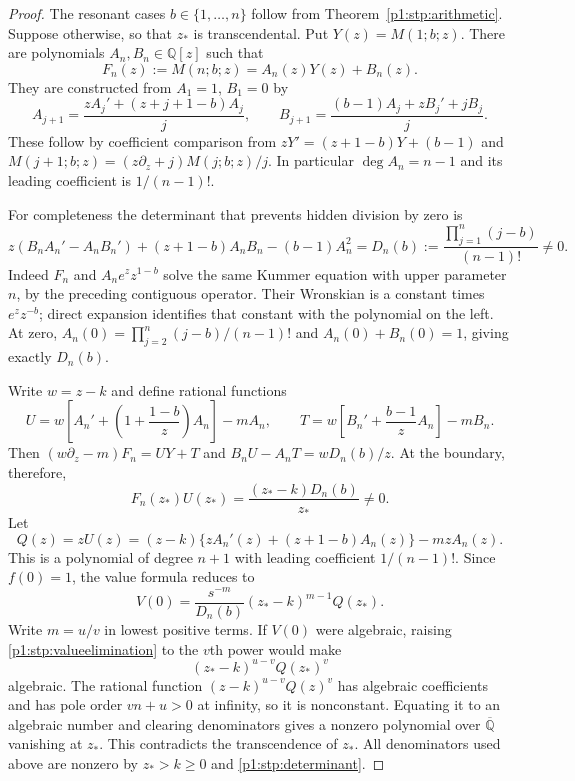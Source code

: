 \documentclass[11pt,a4paper]{article}
\theoremstyle{definition}
\theoremstyle{remark}
\numberwithin{equation}{section}
\begin{document}
\begin{proof}
The resonant cases $b\in\{1,\ldots,n\}$ follow from
Theorem~\ref{p1:stp:arithmetic}.  Suppose otherwise, so that $z_*$
is transcendental.  Put $Y(z)=M(1;b;z)$.  There are polynomials
$A_n,B_n\in\mathbb Q[z]$ such that
\[
 F_n(z):=M(n;b;z)=A_n(z)Y(z)+B_n(z).
\]
They are constructed from $A_1=1$, $B_1=0$ by
\[
 A_{j+1}=\frac{zA_j'+(z+j+1-b)A_j}{j},\qquad
 B_{j+1}=\frac{(b-1)A_j+zB_j'+jB_j}{j}.
\]
These follow by coefficient comparison from
$zY'=(z+1-b)Y+(b-1)$ and
$M(j+1;b;z)=(z\partial_z+j)M(j;b;z)/j$.
In particular $\deg A_n=n-1$ and its leading coefficient is
$1/(n-1)!$.

For completeness the determinant that prevents hidden division by
zero is
\begin{equation}\label{p1:stp:determinant}
 z(B_nA_n'-A_nB_n')+(z+1-b)A_nB_n-(b-1)A_n^2
 =D_n(b):=\frac{\prod_{j=1}^n(j-b)}{(n-1)!}\ne0.
\end{equation}
Indeed $F_n$ and $A_n e^zz^{1-b}$ solve the same Kummer equation
with upper parameter $n$, by the preceding contiguous operator.
Their Wronskian is a constant times $e^zz^{-b}$; direct expansion
identifies that constant with the polynomial on the left.
At zero, $A_n(0)=\prod_{j=2}^n(j-b)/(n-1)!$ and
$A_n(0)+B_n(0)=1$, giving exactly $D_n(b)$.

Write $w=z-k$ and define rational functions
\[
 U=w\left[A_n'+\left(1+\frac{1-b}{z}\right)A_n\right]-mA_n,
 \qquad
 T=w\left[B_n'+\frac{b-1}{z}A_n\right]-mB_n.
\]
Then $(w\partial_z-m)F_n=UY+T$ and
$B_nU-A_nT=wD_n(b)/z$.  At the boundary, therefore,
\[
 F_n(z_*)U(z_*)=\frac{(z_*-k)D_n(b)}{z_*}\ne0.
\]
Let
\begin{equation}\label{p1:stp:Qpoly}
 Q(z)=zU(z)
 =(z-k)\{zA_n'(z)+(z+1-b)A_n(z)\}-mzA_n(z).
\end{equation}
This is a polynomial of degree $n+1$ with leading coefficient
$1/(n-1)!$.  Since $f(0)=1$, the value formula reduces to
\begin{equation}\label{p1:stp:valueelimination}
 V(0)=\frac{s^{-m}}{D_n(b)}
       (z_*-k)^{m-1}Q(z_*).
\end{equation}
Write $m=u/v$ in lowest positive terms.  If $V(0)$ were
algebraic, raising \eqref{p1:stp:valueelimination} to the $v$th
power would make
\[
             (z_*-k)^{u-v}Q(z_*)^v
\]
algebraic.  The rational function
$(z-k)^{u-v}Q(z)^v$ has algebraic coefficients and has pole order
$vn+u>0$ at infinity, so it is nonconstant.  Equating it to an
algebraic number and clearing denominators gives a nonzero polynomial
over $\overline{\mathbb Q}$ vanishing at $z_*$.  This contradicts
the transcendence of $z_*$.  All denominators used above are nonzero
by $z_*>k\ge0$ and \eqref{p1:stp:determinant}.
\end{proof}
\end{document}
